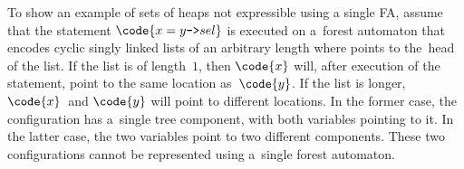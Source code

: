 {To show an example of sets of heaps not expressible using a single FA, assume that the statement $\code{x = y\text{\texttt{->}}sel}$ is
executed on a~forest automaton that encodes
cyclic singly linked lists of an arbitrary length where  points to
the~head of the list.
%
If the list is of length~$1$, then $\code{x}$ will, after execution of the
statement, point to the same location
as~$\code{y}$.
If the list is longer, $\code{x}$~and $\code{y}$ will point to different
locations.
%
In the former case, the configuration has a~single tree component, with both variables pointing to it.
In the latter case, the two variables point to two different components.
%
These two configurations cannot be represented using a~single forest automaton.


}

